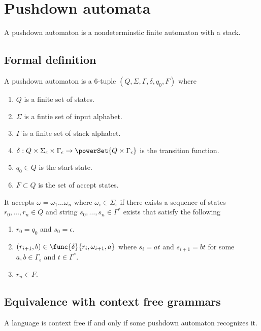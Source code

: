 \section{Pushdown automata}
A pushdown automaton is a nondeterminstic finite automaton with a stack. 
\subsection{Formal definition}
\begin{definition}
    A pushdown automaton is a 6-tuple \((Q,\Sigma,\Gamma, \delta, q_0,F)\) where 
    \begin{enumerate}
        \item \(Q\) is a finite set of states.
        \item \(\Sigma\) is a fintie set of input alphabet.
        \item \(\Gamma\) is a finite set of stack alphabet.
        \item \(\delta: Q \times \Sigma_{\epsilon} \times \Gamma_{\epsilon} \to \powerSet{Q \times \Gamma_{\epsilon}}\) is the transition function.
        \item \(q_0 \in Q\) is the start state.
        \item \(F \subset Q\) is the set of accept states.
    \end{enumerate}
\end{definition}

It accepts \(\omega = \omega_1 \dots \omega_n\) where \(\omega_i \in \Sigma_{\epsilon}\) if there exists a sequence of states \(r_0, \dots , r_n \in Q\) and string \(s_0, \dots , s_n \in \Gamma^{\ast}\) exists that satisfy the following 
\begin{enumerate}
    \item \(r_0 = q_0\) and \(s_0 = \epsilon\).
    \item \((r_{i+1},b) \in \func{\delta}{r_i, \omega_{i+1},a}\) where \(s_i = at\) and \(s_{i+1} = bt\) for some \(a,b \in \Gamma_{\epsilon}\) and \(t \in \Gamma^{\ast}\).
    \item \(r_n \in F\).
\end{enumerate}
\subsection{Equivalence with context free grammars}
\begin{theorem}
    A language is context free if and only if some pushdown automaton recognizes it.
\end{theorem}

